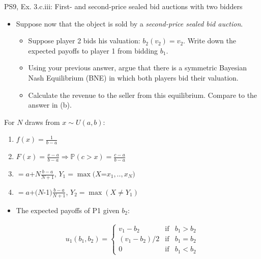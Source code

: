 \begin{frame}{PS9, Ex. 3.c.iii: First- and second-price sealed bid auctions with two bidders}
    \begin{multicols}{2}
      \begin{itemize}
        \item[(c)] Suppose now that the object is sold by a \textit{second-price sealed bid auction}.
        \begin{itemize}\normalsize
          \item[i.]   Suppose player 2 bids his valuation: $b_2(v_2) = v_2$. Write down the expected payoffs to player 1 from bidding $b_1$.
          \item[ii.]  Using your previous answer, argue that there is a symmetric Bayesian Nash Equilibrium (BNE) in which both players bid their valuation.
          \item[iii.] Calculate the revenue to the seller from this equilibrium. Compare to the answer in (b).
        \end{itemize}
      \end{itemize}
      For $N$ draws from $x\sim U(a, b):$
      \vspace{-6pt}
      \begin{enumerate}
        \item[PDF:] $f(x)=\frac{1}{b-a}$
        \item[CDF:] $F(x)=\frac{x-a}{b-a}\Rightarrow\mathbb{P}(c>x)=\frac{c-a}{b-a}$
        \item[$\mathbb{E}(Y_1)$] $=a$+$N\frac{b-a}{N+1}$, $Y_1=\max(X$=$x_1,..,x_N)$
        \item[$\mathbb{E}(Y_2)$] $=a$+$(N$-1$)\frac{b-a}{N+1}$, $Y_2=\max(X\neq Y_1)$
      \end{enumerate}
      \vfill\null\columnbreak
      \begin{itemize}
        \item[(i)] The expected payoffs of P1 given $b_2$:
      \end{itemize}
      \vspace{-16pt}
      \begin{align*}
        u_1(b_1,b_2)=\left\{\begin{array}{lcl}
          v_1-b_2     & \text{if} & b_1>b_2 \\
          (v_1-b_2)/2 & \text{if} & b_1=b_2 \\
          0           & \text{if} & b_1<b_2
        \end{array}\right.
      \end{align*}

\end{multicols}
\end{frame}
